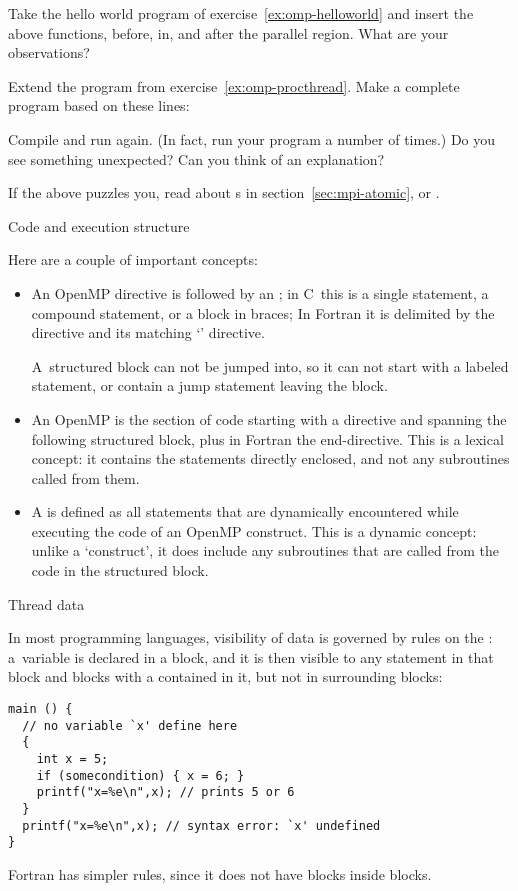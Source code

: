 \begin{exercise}
  \label{ex:omp-procthread}
  Take the hello world program of exercise~\ref{ex:omp-helloworld}
  and insert the above functions, before, in, and after the parallel region.
  What are your observations?
\end{exercise}

\begin{exercise}
  \label{ex:omp-procthreadn}
  Extend the program from exercise~\ref{ex:omp-procthread}. Make a
  complete program based on these lines:


  Compile and run again. (In fact, run your program a number of times.)
  Do you see something unexpected? Can you think
  of an explanation?
\end{exercise}

If the above puzzles you, read about s
in section~\ref{sec:mpi-atomic},
or .

 {Code and execution structure}
\label{sec:omp-code-structure}

Here are a couple of important concepts:
\begin{itemize}
\item An OpenMP directive is followed by an
  ; in C~this is a single statement, a
  compound statement, or a block in braces; In Fortran it is
  delimited by the directive and its matching `' directive.

  A~structured block can not be jumped into, so it can not start with a
  labeled statement, or contain a jump statement leaving the block.
\item 
 An OpenMP  is the section of code
  starting with a directive and spanning the following structured block,
  plus in Fortran the end-directive. This is a lexical concept: it contains
  the statements directly enclosed, and not any subroutines called from them.
\item
  A  is defined as all statements
  that are dynamically encountered while executing the code of an OpenMP construct.
  This is a dynamic concept: unlike a `construct', it does include any subroutines
  that are called from the code in the structured block.
\end{itemize}

 {Thread data}

In most programming languages, visibility of data
is governed by rules on the :
a~variable is declared in a block, and it is then visible to any
statement in that block and blocks with a 
contained in it, but not in surrounding blocks:
\lstset{language=C}
\begin{lstlisting}
main () {
  // no variable `x' define here
  {
    int x = 5;
    if (somecondition) { x = 6; }
    printf("x=%e\n",x); // prints 5 or 6
  }
  printf("x=%e\n",x); // syntax error: `x' undefined
}
\end{lstlisting}
Fortran has simpler rules, since it does not have blocks inside blocks.

